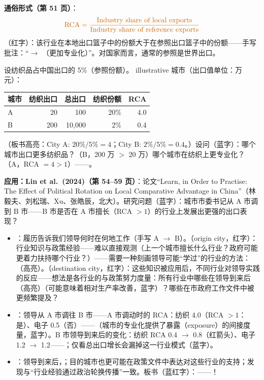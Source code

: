 \textbf{通俗形式（第 51 页）}：
\[
{\color{hlorange}\mathrm{RCA} = \frac{\text{Industry share of local exports}}{\text{Industry share of reference exports}}}
\]
（红字）：该行业在本地出口篮子中的份额大于在参照出口篮子中的份额——手写批注：``$\to$ （更加专业化）''。对国家而言，通常的参照是世界出口。

\begin{exbox}
设纺织品占中国出口的 5\%（参照份额）。 illustrative 城市（出口值单位：万元）：
\begin{center}
\begin{tabular}{@{}lrrrr@{}}
\toprule
城市 & 纺织出口 & 总出口 & 纺织份额 & RCA \\
\midrule
A & 20 & 100 & 20\% & 4.0 \\
B & 200 & 10{,}000 & 2\% & 0.4 \\
\bottomrule
\end{tabular}
\end{center}
（板书高亮：City A: $20\% / 5\% = 4$；City B: $2\% / 5\% = 0.4$。）设问（蓝字）：哪个城市出口更多纺织品？（B，200 万 $>$ 20 万）哪个城市在纺织上更专业化？（A，RCA $= 4 > 1$）——。
\end{exbox}

\textbf{应用：Lin et al.\ (2024)（第 54--59 页）}：论文``Learn, in Order to Practise: The Effect of Political Rotation on Local Comparative Advantage in China''（林毅夫、刘松瑞、Xu、张皓辰，北大）。研究问题（蓝字）：城市市委书记从 A 市调到 B 市——B 市是否在 A 市擅长（RCA $> 1$）的行业上发展出更强的出口表现？
\begin{itemize}
  \item {}：履历告诉我们领导何时在何地工作（手写 A $\to$ B）。（origin city，红字）：行业知识与政策经验——难以直接观测（上一个城市擅长什么行业？政府可能更着力扶持哪个行业？）——需要一种刻画领导可能``学过''的行业的方法：（高亮）。（destination city，红字）：这些知识被应用后，不同行业对领导实践的反应——想法是各行业的与政策努力度量：所有行业中哪些在领导到来后（高亮）（可能意味着相对生产率改善，蓝字）？哪些在市政府工作文件中被更频繁提及？
  \item {}：领导从 A 市调往 B 市——A 市调动时的 RCA：纺织 4.0（RCA $> 1$：是）、电子 0.5（否）——（城市的专业化提供了暴露（exposure）的间接度量，蓝字）。B 市领导到来后的变化：纺织 RCA 0.4 $\to$ 0.8（红箭头）、电子 1.2 $\to$ 1.2——；仅看总出口增长会漏掉这一行业模式（蓝字）。
  \item {}：领导到来后，；目的城市也更可能在政策文件中表达对这些行业的支持；发现与``行业经验通过政治轮换传播''一致。板书（蓝红字）：——！
\end{itemize}

